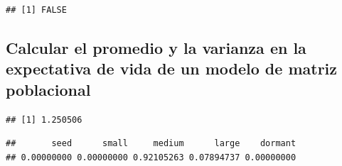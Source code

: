 \documentclass[
]{book}
\newenvironment{Shaded}{\begin{snugshade}}{\end{snugshade}}
\newcommand{\AttributeTok}[1]{\textcolor[rgb]{0.13,0.29,0.53}{#1}}
\newcommand{\CommentTok}[1]{\textcolor[rgb]{0.56,0.35,0.01}{\textit{#1}}}
\newcommand{\DecValTok}[1]{\textcolor[rgb]{0.00,0.00,0.81}{#1}}
\newcommand{\FunctionTok}[1]{\textcolor[rgb]{0.13,0.29,0.53}{\textbf{#1}}}
\newcommand{\NormalTok}[1]{#1}
\newcommand{\OtherTok}[1]{\textcolor[rgb]{0.56,0.35,0.01}{#1}}
\newcommand{\SpecialCharTok}[1]{\textcolor[rgb]{0.81,0.36,0.00}{\textbf{#1}}}
\theoremstyle{definition}
\theoremstyle{definition}
\theoremstyle{definition}
\theoremstyle{definition}
\theoremstyle{remark}
\begin{document}
\begin{verbatim}
## [1] FALSE
\end{verbatim}

\begin{Shaded}
\end{Shaded}

\subsection{Calcular el promedio y la varianza en la expectativa de vida de un modelo de matriz poblacional}\label{calcular-el-promedio-y-la-varianza-en-la-expectativa-de-vida-de-un-modelo-de-matriz-poblacional}

\begin{Shaded}
\end{Shaded}

\begin{verbatim}
## [1] 1.250506
\end{verbatim}

\begin{Shaded}
\end{Shaded}

\begin{verbatim}
##       seed      small     medium      large    dormant 
## 0.00000000 0.00000000 0.92105263 0.07894737 0.00000000
\end{verbatim}
\end{document}
